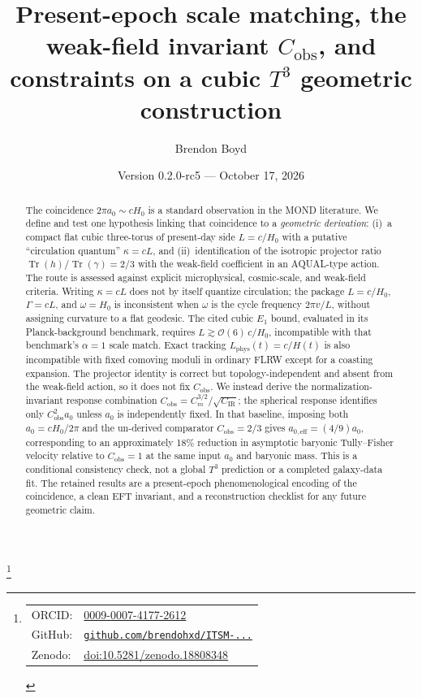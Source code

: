 \documentclass[aps,prd,reprint,superscriptaddress,nofootinbib,floatfix,showkeys]{revtex4-2}
\newcommand{\Tthree}{T^{3}}
\newcommand{\Cobs}{C_{\mathrm{obs}}}
\newcommand{\Cm}{C_{m}}
\newcommand{\CIR}{C_{\mathrm{IR}}}
\newcommand{\azero}{a_{0}}
\newcommand{\Hzero}{H_{0}}
\begin{document}
\title{Present-epoch scale matching, the weak-field invariant
\texorpdfstring{\(\Cobs\)}{C\_obs}, and constraints on a cubic
\texorpdfstring{\(\Tthree\)}{T3} geometric construction}

\author{Brendon Boyd}
\thanks{%
\begin{tabular}{@{}l@{\ }l@{}}
ORCID: & \href{https://orcid.org/0009-0007-4177-2612}{0009-0007-4177-2612} \\
GitHub: & \href{https://github.com/brendohxd/ITSM-Integrated-Toroidal-Syntropic-Model}{\texttt{github.com/brendohxd/ITSM-...}} \\
Zenodo: & \href{https://doi.org/10.5281/zenodo.18808348}{doi:10.5281/zenodo.18808348} \\
\end{tabular}%
}

\date{Version 0.2.0-rc5 --- October 17, 2026}

\begin{abstract}
The coincidence \(2\pi\azero\sim c\Hzero\) is a standard observation in the
MOND literature.  We define and test one hypothesis linking that coincidence to a
\emph{geometric derivation}: (i)~a compact flat cubic three-torus of present-day
side \(L=c/\Hzero\) with a putative ``circulation quantum'' \(\kappa=cL\), and
(ii)~identification of the isotropic projector ratio
\(\operatorname{Tr}(h)/\operatorname{Tr}(\gamma)=2/3\) with the weak-field
coefficient in an AQUAL-type action.  The route is assessed against explicit
microphysical, cosmic-scale, and weak-field criteria.  Writing \(\kappa=cL\)
does not by itself quantize circulation; the package \(L=c/\Hzero\),
\(\Gamma=cL\), and \(\omega=\Hzero\) is inconsistent when \(\omega\) is the
cycle frequency \(2\pi v/L\), without assigning curvature to a flat geodesic.
The cited cubic \(E_1\) bound, evaluated in its Planck-background benchmark,
requires \(L\gtrsim\mathcal{O}(6)\,c/\Hzero\), incompatible with that
benchmark's \(\alpha=1\) scale match.  Exact tracking \(L_{\mathrm{phys}}(t)=c/H(t)\) is
also incompatible with fixed comoving moduli in ordinary FLRW except for a
coasting expansion.  The projector identity is correct but
topology-independent and absent from the weak-field action, so it does not fix
\(\Cobs\).  We instead derive the normalization-invariant response combination
\(\Cobs=\Cm^{3/2}/\sqrt{\CIR}\); the spherical response identifies only
\(\Cobs^2\azero\) unless \(\azero\) is independently fixed.  In that baseline, imposing
both \(\azero=c\Hzero/2\pi\) and the un-derived comparator \(\Cobs=2/3\)
gives \(a_{0,\mathrm{eff}}=(4/9)\azero\), corresponding to an approximately
18\% reduction in asymptotic baryonic Tully--Fisher velocity relative to
\(\Cobs=1\) at the same input \(\azero\) and baryonic mass. This
is a conditional consistency check, not a global \(\Tthree\) prediction or a
completed galaxy-data fit.  The retained results are a present-epoch
phenomenological encoding of the coincidence, a clean EFT invariant, and a
reconstruction checklist for any future geometric claim.
\end{abstract}
\end{document}
